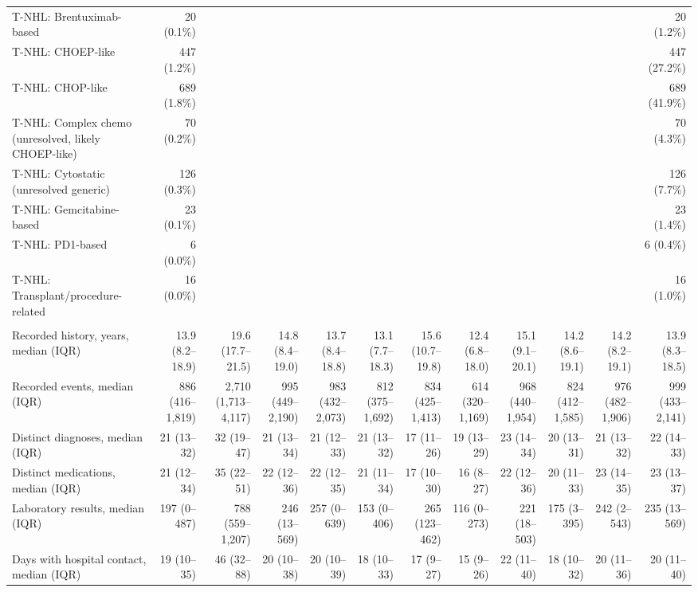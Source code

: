 \begin{table}
{\begin{tabular}{@{}lrrrrrrrrrrr@{}}
\quad T-NHL: Brentuximab-based & 20 (0.1\%) &  &  &  &  &  &  &  &  &  & 20 (1.2\%) \\
\quad T-NHL: CHOEP-like & 447 (1.2\%) &  &  &  &  &  &  &  &  &  & 447 (27.2\%) \\
\quad T-NHL: CHOP-like & 689 (1.8\%) &  &  &  &  &  &  &  &  &  & 689 (41.9\%) \\
\quad T-NHL: Complex chemo (unresolved, likely CHOEP-like) & 70 (0.2\%) &  &  &  &  &  &  &  &  &  & 70 (4.3\%) \\
\quad T-NHL: Cytostatic (unresolved generic) & 126 (0.3\%) &  &  &  &  &  &  &  &  &  & 126 (7.7\%) \\
\quad T-NHL: Gemcitabine-based & 23 (0.1\%) &  &  &  &  &  &  &  &  &  & 23 (1.4\%) \\
\quad T-NHL: PD1-based & 6 (0.0\%) &  &  &  &  &  &  &  &  &  & 6 (0.4\%) \\
\quad T-NHL: Transplant/procedure-related & 16 (0.0\%) &  &  &  &  &  &  &  &  &  & 16 (1.0\%) \\
\addlinespace
\multicolumn{12}{@{}l}{\sffamily\bfseries Pre-index history}\\
Recorded history, years, median (IQR) & 13.9 (8.2–18.9) & 19.6 (17.7–21.5) & 14.8 (8.4–19.0) & 13.7 (8.4–18.8) & 13.1 (7.7–18.3) & 15.6 (10.7–19.8) & 12.4 (6.8–18.0) & 15.1 (9.1–20.1) & 14.2 (8.6–19.1) & 14.2 (8.2–19.1) & 13.9 (8.3–18.5) \\
Recorded events, median (IQR) & 886 (416–1,819) & 2,710 (1,713–4,117) & 995 (449–2,190) & 983 (432–2,073) & 812 (375–1,692) & 834 (425–1,413) & 614 (320–1,169) & 968 (440–1,954) & 824 (412–1,585) & 976 (482–1,906) & 999 (433–2,141) \\
Distinct diagnoses, median (IQR) & 21 (13–32) & 32 (19–47) & 21 (13–34) & 21 (12–33) & 21 (13–32) & 17 (11–26) & 19 (13–29) & 23 (14–34) & 20 (13–31) & 21 (13–32) & 22 (14–33) \\
Distinct medications, median (IQR) & 21 (12–34) & 35 (22–51) & 22 (12–36) & 22 (12–35) & 21 (11–34) & 17 (10–30) & 16 (8–27) & 22 (12–36) & 20 (11–33) & 23 (14–35) & 23 (13–37) \\
Laboratory results, median (IQR) & 197 (0–487) & 788 (559–1,207) & 246 (13–569) & 257 (0–639) & 153 (0–406) & 265 (123–462) & 116 (0–273) & 221 (18–503) & 175 (3–395) & 242 (2–543) & 235 (13–569) \\
Days with hospital contact, median (IQR) & 19 (10–35) & 46 (32–88) & 20 (10–38) & 20 (10–39) & 18 (10–33) & 17 (9–27) & 15 (9–26) & 22 (11–40) & 18 (10–32) & 20 (11–36) & 20 (11–40) \\

\end{tabular}}
\end{table}
